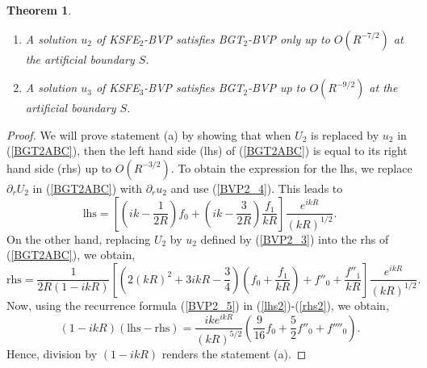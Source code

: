 \documentclass[final,3p,times,12pt]{elsarticle}
\newtheorem{Theorem}{Theorem}
\begin{document}
\hspace{1cm}
\begin{Theorem}\label{Non-Equiv}
\hfill
\begin{enumerate}
\item
A solution $u_2$ of KSFE$_2$-BVP satisfies BGT$_2$-BVP only up to $O( R^{-7/2})$ at the artificial boundary $S$.
\item
A solution $u_3$ of KSFE$_3$-BVP satisfies BGT$_2$-BVP up to $O(R^{-9/2})$ at the artificial boundary $S$.
\end{enumerate}
\end{Theorem}
\begin{proof}
We will prove statement (a) by showing that when $U_{2}$ is replaced by $u_{2}$ in (\ref{BGT2ABC}), then the left hand side (lhs) of (\ref{BGT2ABC}) is equal to its right hand side (rhs) up to $O(R^{-3/2})$.
To obtain the expression for the lhs, we replace $\partial_r U_2$ in (\ref{BGT2ABC}) with $\partial_r u_2$ and use (\ref{BVP2_4}). This leads to
\begin{equation}
\text{lhs} = \left[ \left( ik - \frac{1}{2R} \right) f_{0} + \left( ik - \frac{3}{2R} \right) \frac{f_{1}}{kR}  \right] \frac{e^{ikR}}{(kR)^{1/2}}. \label{lhs2}
\end{equation}
On the other hand, replacing $U_2$ by $u_2$ defined by (\ref{BVP2_3}) into the rhs of (\ref{BGT2ABC}), we obtain,
\begin{equation}
\text{rhs} = \frac{1}{2R \left( 1 - ikR \right)} \left[ \left( 2(kR)^2 + 3ikR - \frac{3}{4} \right)\left( f_{0} + \frac{f_{1}}{kR} \right) + f''_{0} + \frac{f''_{1}}{kR} \right] \frac{e^{ikR}}{(kR)^{1/2}}. \label{rhs2}
\end{equation}
Now, using the recurrence formula (\ref{BVP2_5}) in (\ref{lhs2})-(\ref{rhs2}), we obtain,
\begin{equation}
\left( 1- ikR \right) \left( \text{lhs} - \text{rhs} \right) =  \frac{ik e^{ikR}}{(kR)^{5/2}} \left( \frac{9}{16} f_{0} + \frac{5}{2} f''_{0} + f''''_{0} \right). \label{diff}
\end{equation}
Hence, division by $(1-ikR)$ renders the statement (a). 



\end{proof}
\end{document}
